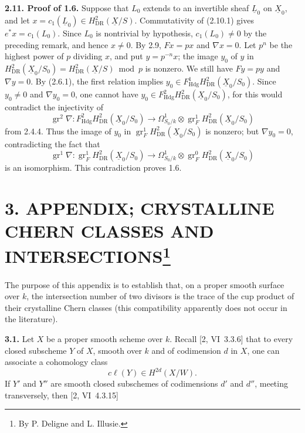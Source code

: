 \documentclass[10pt]{article}
\newcommand{\UX}{\underline{X}}
\newcommand{\UL}{\underline{L}}
\begin{document}
\noindent\textbf{2.11. Proof of 1.6.} Suppose that $L_0$ extends to an invertible sheaf $\UL_0$ on $\UX_0$, and let $x=c_1(\UL_0)\in H^2_{\mathrm{DR}}(\UX/S)$. Commutativity of (2.10.1) gives $e^*x=c_1(L_0)$. Since $L_0$ is nontrivial by hypothesis, $c_1(L_0)\ne0$ by the preceding remark, and hence $x\ne0$. By 2.9, $Fx=px$ and $\nabla x=0$. Let $p^n$ be the highest power of $p$ dividing $x$, and put $y=p^{-n}x$; the image $y_0$ of $y$ in
$H^2_{\mathrm{DR}}(\UX_0/S_0)=H^2_{\mathrm{DR}}(\UX/S)\bmod p$ is nonzero. We still have $Fy=py$ and $\nabla y=0$. By (2.6.1), the first relation implies
$y_0\in F^1_{\mathrm{Hdg}}H^2_{\mathrm{DR}}(\UX_0/S_0)$. Since $y_0\ne0$ and $\nabla y_0=0$, one cannot have
$y_0\in F^2_{\mathrm{Hdg}}H^2_{\mathrm{DR}}(\UX_0/S_0)$, for this would contradict the injectivity of
\[
\operatorname{gr}^2\nabla:F^2_{\mathrm{Hdg}}H^2_{\mathrm{DR}}(\UX_0/S_0)
\longrightarrow\Omega^1_{S_0/k}\otimes\operatorname{gr}^1_FH^2_{\mathrm{DR}}(\UX_0/S_0)
\]
from 2.4.4. Thus the image of $y_0$ in $\operatorname{gr}^1_FH^2_{\mathrm{DR}}(\UX_0/S_0)$ is nonzero; but $\nabla y_0=0$, contradicting the fact that
\[
\operatorname{gr}^1\nabla:\operatorname{gr}^1_FH^2_{\mathrm{DR}}(\UX_0/S_0)
\longrightarrow\Omega^1_{S_0/k}\otimes\operatorname{gr}^0_FH^2_{\mathrm{DR}}(\UX_0/S_0)
\]
is an isomorphism. This contradiction proves 1.6.

\section*{3. APPENDIX; CRYSTALLINE CHERN CLASSES AND INTERSECTIONS\footnote{By P. Deligne and L. Illusie.}}
The purpose of this appendix is to establish that, on a proper smooth surface over $k$, the intersection number of two divisors is the trace of the cup product of their crystalline Chern classes (this compatibility apparently does not occur in the literature).

\noindent\textbf{3.1.} Let $X$ be a proper smooth scheme over $k$. Recall [2, VI~3.3.6] that to every closed subscheme $Y$ of $X$, smooth over $k$ and of codimension $d$ in $X$, one can associate a cohomology class
\begin{equation}\tag{3.1.1}
c\ell(Y)\in H^{2d}(X/W).
\end{equation}
If $Y'$ and $Y''$ are smooth closed subschemes of codimensions $d'$ and $d''$, meeting transversely, then [2, VI~4.3.15]
\newpage
\setcounter{footnote}{0}
\fontsize{10.2pt}{12.04pt}\selectfont
\end{document}
